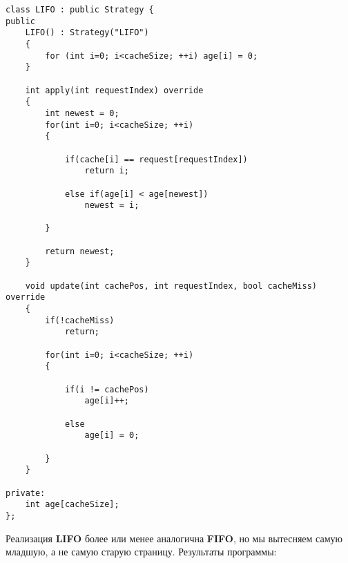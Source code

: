 \begin{tcolorbox}
\begin{verbatim}
class LIFO : public Strategy {
public
	LIFO() : Strategy("LIFO")
	{
		for (int i=0; i<cacheSize; ++i) age[i] = 0;
	}
	
	int apply(int requestIndex) override
	{
		int newest = 0;
		for(int i=0; i<cacheSize; ++i)
		{
		
			if(cache[i] == request[requestIndex])
				return i;
			
			else if(age[i] < age[newest])
				newest = i;
		
		}
		
		return newest;
	}
	
	void update(int cachePos, int requestIndex, bool cacheMiss) override
	{
		if(!cacheMiss)
			return;
		
		for(int i=0; i<cacheSize; ++i)
		{
		
			if(i != cachePos)
				age[i]++;
			
			else
				age[i] = 0;
		
		}
	}
	
private:
	int age[cacheSize];
};
\end{verbatim}
\end{tcolorbox}

Реализация \textbf{LIFO} более или менее аналогична \textbf{FIFO}, но мы вытесняем самую младшую, а не самую старую страницу. Результаты программы:

